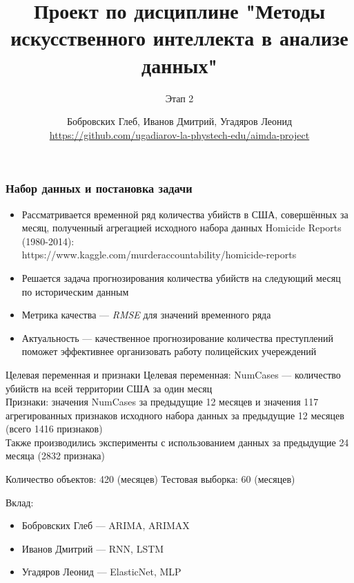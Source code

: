 \documentclass[aspectratio=169,8pt]{beamer}
\title[Проект по дисциплине МИИАД] {Проект по дисциплине "Методы искусственного интеллекта в анализе данных"}
\subtitle{Этап 2}
\author[Бобровских, Иванов, Угадяров] {Бобровских Глеб, Иванов Дмитрий, Угадяров Леонид \\ \tiny\url{https://github.com/ugadiarov-la-phystech-edu/aimda-project}}
\institute{Группа 4}
\begin{document}
\begin{frame}
\titlepage
\end{frame}

\begin{frame}
\frametitle{Набор данных и постановка задачи}

\begin{itemize}
\item { Рассматривается временной ряд количества убийств в США, совершённых за месяц, полученный агрегацией исходного набора данных Homicide Reports (1980-2014):\\https://www.kaggle.com/murderaccountability/homicide-reports }
\item Решается задача прогнозирования количества убийств на следующий месяц по историческим данным
\item Метрика качества --- \emph {RMSE} для значений временного ряда
\item {Актуальность --- качественное прогнозирование количества преступлений поможет эффективнее организовать работу полицейских учереждений  }
\end{itemize}

\begin{block}{Целевая переменная и признаки}
Целевая переменная: NumCases --- количество убийств на всей территории США за один месяц\\
Признаки: значения NumCases за предыдущие 12 месяцев и значения 117 агрегированных признаков исходного набора данных за предыдущие 12 месяцев (всего 1416 признаков)\\
Также производились эксперименты с использованием данных за предыдущие 24 месяца (2832 признака)
\end{block}

Количество объектов:  420 (месяцев)\newline
Тестовая выборка: 60 (месяцев) \newline

Вклад:
\begin{itemize}
\item Бобровских Глеб --- ARIMA, ARIMAX
\item Иванов Дмитрий --- RNN, LSTM
\item Угадяров Леонид --- ElasticNet, MLP
\end{itemize}

\end{frame}
\end{document}
